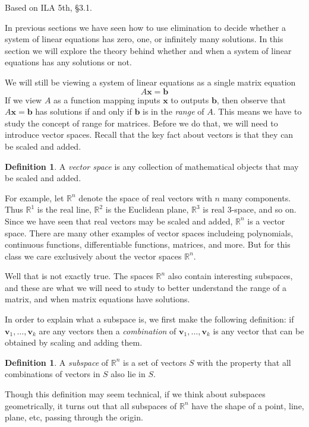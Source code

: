 \documentclass[11pt,oneside]{amsbook}
\newcommand{\R}{\mathbb R}
\theoremstyle{definition}
\theoremstyle{plain}
\theoremstyle{definition}
\newtheorem{definition}[theorem]{Definition}
\theoremstyle{remark}
\numberwithin{equation}{section}
\numberwithin{figure}{section}
\begin{document}
Based on ILA 5th, \S 3.1.

In previous sections we have seen how to use elimination to decide whether a system of linear equations has zero, one, or infinitely many solutions. In this section we will explore the theory behind whether and when a system of linear equations has any solutions or not.

We will still be viewing a system of linear equations as a single matrix equation
\[A\mathbf{x}=\mathbf{b}
\]
If we view $A$ as a function mapping inputs $\mathbf{x}$ to outputs $\mathbf{b}$, then observe that $A\mathbf{x}=\mathbf{b}$ has solutions if and only if $\mathbf{b}$ is in the \emph{range} of $A$. This means we have to study the concept of range for matrices. Before we do that, we will need to introduce vector spaces. Recall that the key fact about vectors is that they can be scaled and added.

\begin{definition}
  A \emph{vector space} is any collection of mathematical objects that may be scaled and added.
\end{definition}

For example, let $\R^n$ denote the space of real vectors with $n$ many components. Thus $\R^1$ is the real line, $\R^2$ is the Euclidean plane, $\R^3$ is real $3$-space, and so on. Since we have seen that real vectors may be scaled and added, $\R^n$ is a vector space. There are many other examples of vector spaces includeing polynomials, continuous functions, differentiable functions, matrices, and more. But for this class we care exclusively about the vector spaces $\R^n$.

Well that is not exactly true. The spaces $\R^n$ also contain interesting subspaces, and these are what we will need to study to better understand the range of a matrix, and when matrix equations have solutions.

In order to explain what a subspace is, we first make the following definition: if $\textbf{v}_1,\ldots,\textbf{v}_k$ are any vectors then a \emph{combination} of $\textbf{v}_1,\ldots,\textbf{v}_k$ is any vector that can be obtained by scaling and adding them.

\begin{definition}
  A \emph{subspace} of $\R^n$ is a set of vectors $S$ with the property that all combinations of vectors in $S$ also lie in $S$.
\end{definition}

Though this definition may seem technical, if we think about subspaces geometrically, it turns out that all subspaces of $\R^n$ have the shape of a point, line, plane, etc, passing through the origin.
\end{document}
